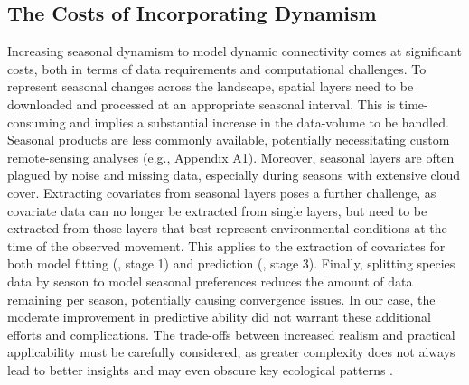 \documentclass[abstract=on,10pt,a4paper,bibliography=totocnumbered]{article}
\begin{document}
\subsection{The Costs of Incorporating Dynamism}

Increasing seasonal dynamism to model dynamic connectivity comes at significant
costs, both in terms of data requirements and computational challenges. To
represent seasonal changes across the landscape, spatial layers need to be
downloaded and processed at an appropriate seasonal interval. This is
time-consuming and implies a substantial increase in the data-volume to be
handled. Seasonal products are less commonly available, potentially
necessitating custom remote-sensing analyses (e.g., Appendix A1). Moreover,
seasonal layers are often plagued by noise and missing data, especially during
seasons with extensive cloud cover. Extracting covariates from seasonal layers
poses a further challenge, as covariate data can no longer be extracted from
single layers, but need to be extracted from those layers that best represent
environmental conditions at the time of the observed movement. This applies to
the extraction of covariates for both model fitting
(, stage 1) and prediction
(, stage 3). Finally, splitting species data by
season to model seasonal preferences reduces the amount of data remaining per
season, potentially causing convergence issues. In our case, the moderate
improvement in predictive ability did not warrant these additional efforts and
complications. The trade-offs between increased realism and practical
applicability must be carefully considered, as greater complexity does not
always lead to better insights and may even obscure key ecological patterns
\citep{Puy.2022}.


\end{document}
